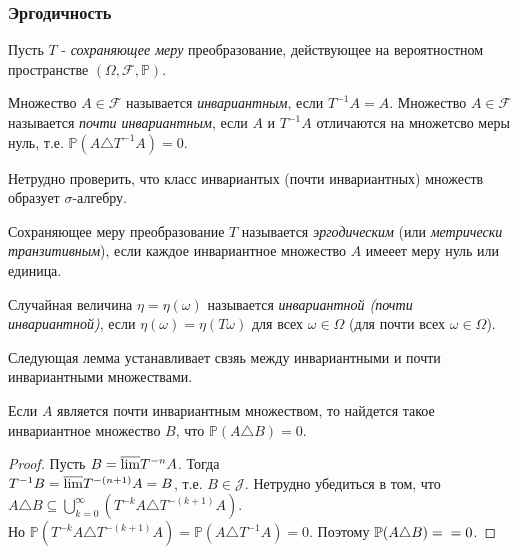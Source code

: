 \subsubsection{Эргодичность}
Пусть $T$ - \textit{сохраняющее меру} преобразование, действующее на вероятностном пространстве $(\Omega, \mathscr{F}, \mathbb{P})$.

\begin{definition} Множество $A \in \mathscr{F}$ называется \textit{инвариантным}, если $T^{-1}A = A$. Множество $A \in \mathscr{F}$ называется \textit{почти инвариантным}, если $A$ и $T^{-1}A$ отличаются на множетсво меры нуль, т.е. $\mathbb{P}(A \triangle T^{-1}A) = 0$.

Нетрудно проверить, что класс инвариантых (почти инвариантных) множеств образует $\sigma$-алгебру.
\end{definition}

\begin{definition} Сохраняющее меру преобразование $T$ называется \textit{эргодическим} (или \textit{метрически транзитивным}), если каждое инвариантное множество $A$ имееет меру нуль или единица.
\end{definition}

\begin{definition} Случайная величина $\eta = \eta(\omega)$ называется \textit{инвариантной (почти инвариантной)}, если $\eta(\omega) = \eta(T\omega)$ для всех $\omega \in \Omega$ (для почти всех $\omega \in \Omega$).
\end{definition}

Следующая лемма устанавливает свзяь между инвариантными и почти инвариантными множествами.

\begin{lemma} Если $A$ является почти инвариантным множеством, то найдется такое инвариантное множество $B$, что $\mathbb{P}(A \triangle B) = 0$.
\end{lemma}

\begin{proof} Пусть $B = \overline{\rm lim}T^{-n}A$. Тогда \\ $T^{-1}B = \overline{\rm lim}T^{-(n+1)}A = B$, т.е. $B \in \mathscr{J}$. Нетрудно убедиться в том, что $A \triangle B \subseteq \bigcup\limits_{k=0}^{\infty} (T^{-k}A\triangle T^{-(k+1)}A)$. \\ Но $\mathbb{P}(T^{-k}A\triangle T^{-(k+1)}A) = \mathbb{P}(A \triangle T^{-1}A) = 0$. Поэтому $\mathbb{P}(A\triangle B) = \\ = 0$. 
\end{proof}

